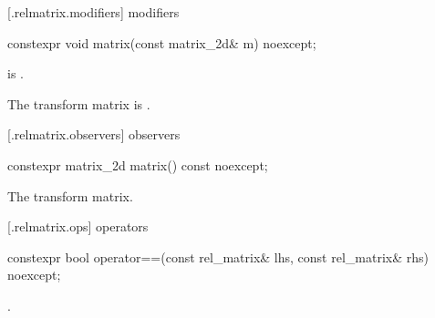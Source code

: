 [\iotwod.relmatrix.modifiers]{ modifiers}

%
\begin{itemdecl}
constexpr void matrix(const matrix_2d& m) noexcept;
\end{itemdecl}
\begin{itemdescr}
\pnum
\requires
{} is .

\pnum
\effects
The transform matrix is .
\end{itemdescr}

 [\iotwod.relmatrix.observers]{ observers}

%
\begin{itemdecl}
constexpr matrix_2d matrix() const noexcept;
\end{itemdecl}
\begin{itemdescr}
\pnum
\returns
The transform matrix.
\end{itemdescr}

 [\iotwod.relmatrix.ops]{ operators}

%
\begin{itemdecl}
constexpr bool operator==(const rel_matrix& lhs, const rel_matrix& rhs) 
  noexcept;
\end{itemdecl}
\begin{itemdescr}
\pnum
\returns
{}.
\end{itemdescr}

